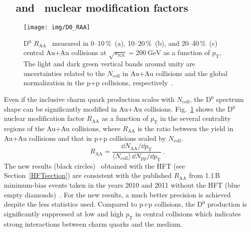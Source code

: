 \subsection{\dzero\ \Raa\ and \Rcp\ nuclear modification factors}
\begin{figure}[!htb]
\begin{center}
 \texttt{[image: img/D0\_RAA]}\\
\end{center}
\caption[D$^0$ $R_\mathrm{AA}$ measured in 0--10$\,\%$, 10--20$\,\%$, and 20--40$\,\%$ central Au+Au collisions.]{\label{dzeroRAA}D$^0$ $R_\mathrm{AA}$~\cite{D0paper} measured in 0--10$\,\%$~(a), 10--20$\,\%$~(b), and 20--40$\,\%$~(c) central Au+Au collisions at $\sqrt{s_\mathrm{NN}} = \SI{200}{\giga\electronvolt}$ as a function of $p_\mathrm{T}$\@. The
light and dark green vertical bands around unity are uncertainties related
to the $N_\mathrm{coll}$ in Au+Au collisions and the global normalization in the p+p collisions,
respectively~\cite{AuAuD0}.}
\end{figure}
Even if the inclusive charm quark production scales with $N_\mathrm{coll}$,
the D$^0$ spectrum shape can be significantly modified in Au+Au collisions. Fig.~\ref{dzeroRAA}
shows the D$^0$ nuclear modification factor
$R_\mathrm{AA}$
as a function of $p_\mathrm{T}$ in the several centrality regions of the Au+Au collisions, where $R_\mathrm{AA}$ is the ratio between the yield in Au+Au collisions
and that in p+p collisions scaled by $N_\mathrm{coll}$\@.
\begin{equation}
R_\mathrm{AA} = \frac{\dd N_\mathrm{AA}/\dd p_\mathrm{T}}
{\langle N_\mathrm{coll} \rangle\, \dd N_\mathrm{pp}/\dd p_\mathrm{T}}\,.
\end{equation}
The new results
(black circles)~\cite{D0paper} obtained with the HFT (see Section~\ref{HFTsection}) are consistent with the published
$R_\mathrm{AA}$ from 1.1$\,$B minimum-bias events taken in the years 2010 and 2011 
without the HFT (blue empty diamonds)~\cite{AuAuD0}\@.
For the new results, a much better precision is achieved despite the less statistics used. 
Compared to p+p collisions, the D$^0$ production is significantly suppressed at low and high $p_\mathrm{T}$ in central collisions which indicates
strong interactions between charm quarks and the medium.

